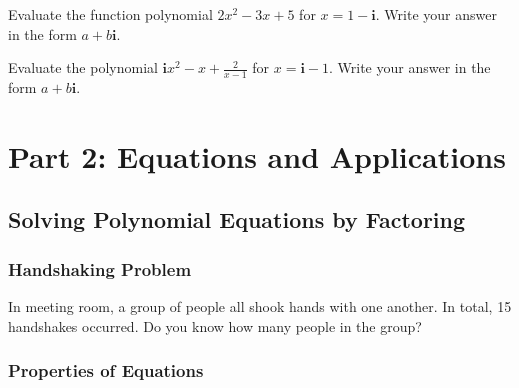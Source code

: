 \documentclass[en,11pt]{elegantbook}
\newcommand{\ii}{\mathbf{i}}
\newcommand{\size}[2]{{\fontsize{#1}{0}\selectfont#2}}
\newenvironment{rmdthink}{
	\vspace*{0.5\baselineskip}
	\par\noindent
	\makebox[-4pt][r]{\color{green!90}\size{12}{\faLightbulbO}\,\,}
    \begin{tcolorbox}[
    enhanced,
    title={\textbf{\color{second}Think}},
    title style={left color=blue!10!green!20!white,right color=yellow!20!blue!20!white},
    colback=green!20!white,
    ]
    \sffamily
}{
    \end{tcolorbox}
	\par\ignorespacesafterend
}
\let\BeginKnitrBlock\begin \let\EndKnitrBlock\end
\begin{document}
\BeginKnitrBlock{exercise}
\protect\hypertarget{exr:unnamed-chunk-109}{}{\label{exr:unnamed-chunk-109} }
Evaluate the function polynomial \(2x^2-3x+5\) for \(x=1-\ii\).
Write your answer in the form \(a+b\ii\).
\EndKnitrBlock{exercise}

\BeginKnitrBlock{exercise}
\protect\hypertarget{exr:unnamed-chunk-110}{}{\label{exr:unnamed-chunk-110} }
Evaluate the polynomial \(\ii x^2-x+\frac{2}{x-1}\) for \(x=\ii-1\).
Write your answer in the form \(a+b\ii\).
\EndKnitrBlock{exercise}

\hypertarget{part-part-2-equations-and-applications}{%
\part*{Part 2: Equations and Applications}\label{part-part-2-equations-and-applications}}

\hypertarget{solving-polynomial-equations-by-factoring}{%
\chapter{Solving Polynomial Equations by Factoring}\label{solving-polynomial-equations-by-factoring}}

\hypertarget{handshaking-problem}{%
\section{Handshaking Problem}\label{handshaking-problem}}

\begin{rmdthink}

In meeting room, a group of people all shook hands with one another. In total, 15 handshakes occurred. Do you know how many people in the group?

\end{rmdthink}

\hypertarget{properties-of-equations}{%
\section{Properties of Equations}\label{properties-of-equations}}
\end{document}
